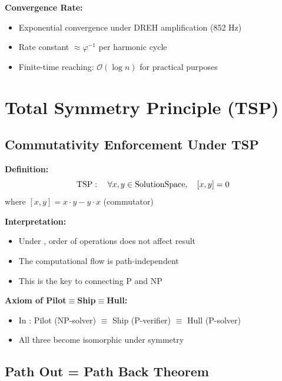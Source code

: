 \textbf{Convergence Rate:}
\begin{itemize}
    \item Exponential convergence under DREH amplification (852 Hz)
    \item Rate constant $\approx \varphi^{-1}$ per harmonic cycle
    \item Finite-time reaching: $\mathcal{O}(\log n)$ for practical purposes
\end{itemize}

\section{Total Symmetry Principle (TSP)} \label{sec:tsp}

\subsection{Commutativity Enforcement Under TSP}

\textbf{Definition:}
\begin{equation}
    \mathrm{TSP}: \quad \forall x,y \in \text{SolutionSpace}, \quad [x,y] = 0
\end{equation}
where $[x,y] = x \cdot y - y \cdot x$ (commutator)

\textbf{Interpretation:}
\begin{itemize}
    \item Under \TSP, order of operations does not affect result
    \item The computational flow is path-independent
    \item This is the key to connecting P and NP
\end{itemize}

\textbf{Axiom of Pilot$\equiv$Ship$\equiv$Hull:}
\begin{itemize}
    \item In \TSP: Pilot (NP-solver) $\equiv$ Ship (P-verifier) $\equiv$ Hull (P-solver)
    \item All three become isomorphic under symmetry
\end{itemize}

\subsection{Path Out = Path Back Theorem}

